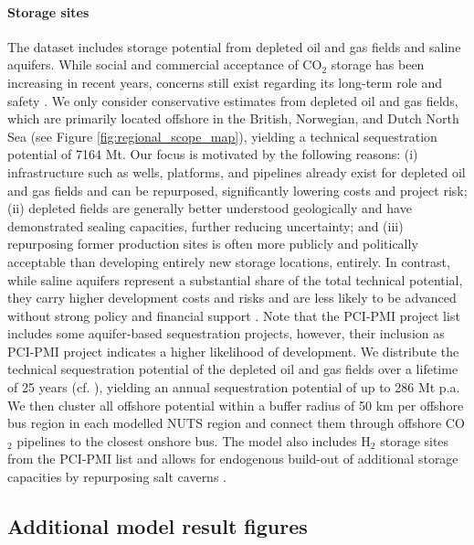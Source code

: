 \documentclass[pdflatex,sn-nature]{sn-jnl}
\theoremstyle{thmstyleone}%
\theoremstyle{thmstyletwo}%
\theoremstyle{thmstylethree}%
\begin{document}
\begin{appendices}
\paragraph{Storage sites}
The dataset includes storage potential from depleted oil and gas fields and saline aquifers. While social and commercial acceptance of CO$_2$ storage has been increasing in recent years, concerns still exist regarding its long-term role and safety \cite{vanalphenSocietalAcceptanceCarbon2007}.
We only consider conservative estimates from depleted oil and gas fields, which are primarily located offshore in the British, Norwegian, and Dutch North Sea (see Figure \ref{fig:regional_scope_map}), yielding a technical sequestration potential of 7164 Mt. Our focus is motivated by the following reasons: (i) infrastructure such as wells, platforms, and pipelines already exist for depleted oil and gas fields and can be repurposed, significantly lowering costs and project risk; (ii) depleted fields are generally better understood geologically and have demonstrated sealing capacities, further reducing uncertainty; and (iii) repurposing former production sites is often more publicly and politically acceptable than developing entirely new storage locations, entirely. In contrast, while saline aquifers represent a substantial share of the total technical potential, they carry higher development costs and risks and are less likely to be advanced without strong policy and financial support \cite{europeancommissionEuropeanCO2Storage2020}. Note that the PCI-PMI project list includes some aquifer-based sequestration projects, however, their inclusion as PCI-PMI project indicates a higher likelihood of development.
We distribute the technical sequestration potential of the depleted oil and gas fields over a lifetime of 25 years (cf. \cite{hofmannH2CO2Network2025}), yielding an annual sequestration potential of up to 286 Mt p.a. We then cluster all offshore potential within a buffer radius of 50 km per offshore bus region in each modelled NUTS region and connect them through offshore CO$_2$ pipelines to the closest onshore bus. 
The model also includes H$_2$ storage sites from the PCI-PMI list and allows for endogenous build-out of additional storage capacities by repurposing salt caverns \cite{neumannPotentialRoleHydrogen2023}.

\clearpage
\subsection*{Additional model result figures}\label{app:additional_figures}


\end{appendices}
\end{document}
